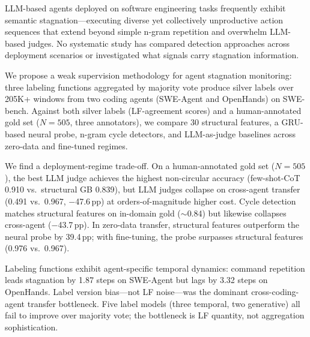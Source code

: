 LLM-based agents deployed on software engineering tasks frequently exhibit semantic stagnation---executing diverse yet collectively unproductive action sequences that extend beyond simple n-gram repetition and overwhelm LLM-based judges.
No systematic study has compared detection approaches across deployment scenarios or investigated what signals carry stagnation information.

We propose a weak supervision methodology for agent stagnation monitoring: three labeling functions aggregated by majority vote produce silver labels over 205K+ windows from two coding agents (SWE-Agent and OpenHands) on SWE-bench.
Against both silver labels (LF-agreement scores) and a human-annotated gold set ($N{=}505$, three annotators), we compare 30 structural features, a GRU-based neural probe, n-gram cycle detectors, and LLM-as-judge baselines across zero-data and fine-tuned regimes.

We find a deployment-regime trade-off.
On a human-annotated gold set ($N{=}505$), the best LLM judge achieves the highest non-circular accuracy (few-shot-CoT 0.910 vs.\ structural GB 0.839), but LLM judges collapse on cross-agent transfer (0.491 vs.\ 0.967, $-$47.6\,pp) at orders-of-magnitude higher cost.
Cycle detection matches structural features on in-domain gold (${\sim}$0.84) but likewise collapses cross-agent ($-$43.7\,pp).
In zero-data transfer, structural features outperform the neural probe by 39.4\,pp; with fine-tuning, the probe surpasses structural features (0.976 vs.\ 0.967).

Labeling functions exhibit agent-specific temporal dynamics: command repetition leads stagnation by 1.87 steps on SWE-Agent but lags by 3.32 steps on OpenHands.
Label version bias---not LF noise---was the dominant cross-coding-agent transfer bottleneck.
Five label models (three temporal, two generative) all fail to improve over majority vote; the bottleneck is LF quantity, not aggregation sophistication.
